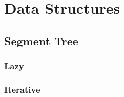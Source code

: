 \documentclass[../Notes/main.tex]{subfiles}
\begin{document}
\section{Data Structures}

\subsection{Segment Tree}

\subsubsection{Lazy}


\subsubsection{Iterative}

\end{document}
